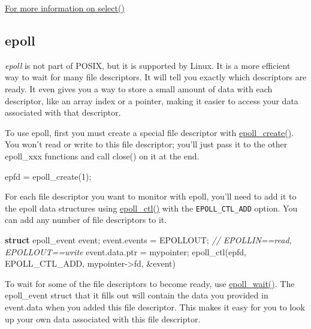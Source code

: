\documentclass[]{article}
\newenvironment{Shaded}{}{}
\newcommand{\KeywordTok}[1]{\textcolor[rgb]{0.00,0.44,0.13}{\textbf{{#1}}}}
\newcommand{\DecValTok}[1]{\textcolor[rgb]{0.25,0.63,0.44}{{#1}}}
\newcommand{\CommentTok}[1]{\textcolor[rgb]{0.38,0.63,0.69}{\textit{{#1}}}}
\newcommand{\NormalTok}[1]{{#1}}
\begin{document}
\href{http://pubs.opengroup.org/onlinepubs/9699919799/functions/select.html}{For
more information on select()}

\subsection{epoll}\label{epoll}

\emph{epoll} is not part of POSIX, but it is supported by Linux. It is a
more efficient way to wait for many file descriptors. It will tell you
exactly which descriptors are ready. It even gives you a way to store a
small amount of data with each descriptor, like an array index or a
pointer, making it easier to access your data associated with that
descriptor.

To use epoll, first you must create a special file descriptor with
\href{http://linux.die.net/man/2/epoll_create}{epoll\_create()}. You
won't read or write to this file descriptor; you'll just pass it to the
other epoll\_xxx functions and call close() on it at the end.

\begin{Shaded}
\begin{Highlighting}[]
    \NormalTok{epfd = epoll_create(}\DecValTok{1}\NormalTok{);}
\end{Highlighting}
\end{Shaded}

For each file descriptor you want to monitor with epoll, you'll need to
add it to the epoll data structures using
\href{http://linux.die.net/man/2/epoll_ctl}{epoll\_ctl()} with the
\texttt{EPOLL\_CTL\_ADD} option. You can add any number of file
descriptors to it.

\begin{Shaded}
\begin{Highlighting}[]
\KeywordTok{struct} \NormalTok{epoll_event event;}
\NormalTok{event.events = EPOLLOUT;  }\CommentTok{// EPOLLIN==read, EPOLLOUT==write}
\NormalTok{event.data.ptr = mypointer;}
\NormalTok{epoll_ctl(epfd, EPOLL_CTL_ADD, mypointer->fd, &event)}
\end{Highlighting}
\end{Shaded}

To wait for some of the file descriptors to become ready, use
\href{http://linux.die.net/man/2/epoll_wait}{epoll\_wait()}. The
epoll\_event struct that it fills out will contain the data you provided
in event.data when you added this file descriptor. This makes it easy
for you to look up your own data associated with this file descriptor.
\end{document}
